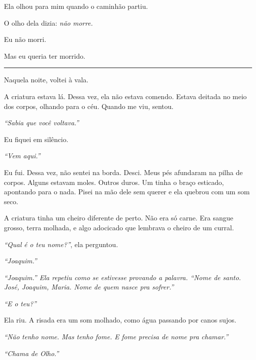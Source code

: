 \noindent Ela olhou para mim quando o caminhão partiu.

\noindent O olho dela dizia: \textit{não morre.}

\noindent Eu não morri.

\noindent Mas eu queria ter morrido.

\vspace{0.5em}\noindent\rule{\textwidth}{0.5pt}\vspace{0.5em}

\noindent Naquela noite, voltei à vala.

\noindent A criatura estava lá. Dessa vez, ela não estava comendo. Estava deitada no meio dos corpos, olhando para o céu. Quando me viu, sentou.

\noindent \textit{\textquotedblleft{}Sabia que você voltava.\textquotedblright{}}

\noindent Eu fiquei em silêncio.

\noindent \textit{\textquotedblleft{}Vem aqui.\textquotedblright{}}

\noindent Eu fui. Dessa vez, não sentei na borda. Desci. Meus pés afundaram na pilha de corpos. Alguns estavam moles. Outros duros. Um tinha o braço esticado, apontando para o nada. Pisei na mão dele sem querer e ela quebrou com um som seco.

\noindent A criatura tinha um cheiro diferente de perto. Não era só carne. Era sangue grosso, terra molhada, e algo adocicado que lembrava o cheiro de um curral.

\noindent \textit{\textquotedblleft{}Qual é o teu nome?\textquotedblright{}}, ela perguntou.

\noindent \textit{\textquotedblleft{}Joaquim.\textquotedblright{}}

\noindent \textit{\textquotedblleft{}Joaquim.\textquotedblright{}\textit{ Ela repetiu como se estivesse provando a palavra. }\textquotedblleft{}Nome de santo. José, Joaquim, Maria. Nome de quem nasce pra sofrer.\textquotedblright{}}

\noindent \textit{\textquotedblleft{}E o teu?\textquotedblright{}}

\noindent Ela riu. A risada era um som molhado, como água passando por canos sujos.

\noindent \textit{\textquotedblleft{}Não tenho nome. Mas tenho fome. E fome precisa de nome pra chamar.\textquotedblright{}}

\noindent \textit{\textquotedblleft{}Chama de Olho.\textquotedblright{}}

